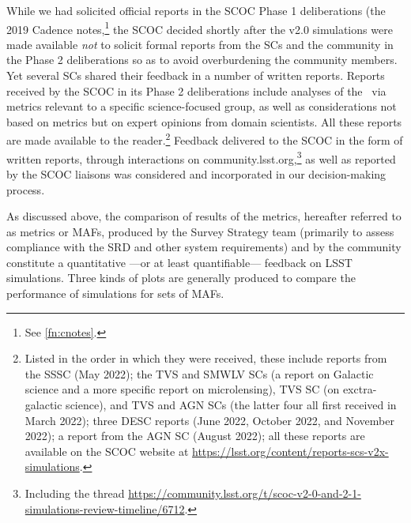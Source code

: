 While we had solicited official reports in the SCOC Phase 1 deliberations (the 2019 Cadence notes,\footnote{See \autoref{fn:cnotes}.}
the SCOC decided shortly after the v2.0 simulations were made available {\it not} to solicit formal reports from the SCs and the community in the Phase 2 deliberations so as to avoid overburdening the community members. Yet several SCs shared their feedback in a number of written reports. Reports received by the SCOC in its Phase 2 deliberations include analyses of the \opsim\ via metrics relevant to a specific science-focused group, as well as  considerations not based on metrics but on expert opinions from domain scientists. All these reports are made available to the reader.\footnote{Listed in the order in which they were received, these include reports from the
SSSC (May 2022);
the TVS and SMWLV SCs (a report on Galactic science and a more specific report on microlensing), TVS SC (on exctra-galactic science), and TVS and AGN SCs (the latter four all first received in March 2022); three 
DESC reports (June 2022, October 2022, and November 2022); a report from the AGN SC (August 2022); all these reports are available on the SCOC website at \url{https://lsst.org/content/reports-scs-v2x-simulations}.} Feedback delivered to the SCOC in the form of written reports, through interactions on community.lsst.org,\footnote{Including the thread \url{https://community.lsst.org/t/scoc-v2-0-and-2-1-simulations-review-timeline/6712}.} as well as reported by the SCOC liaisons was considered and incorporated in our decision-making process. 


As discussed above, the comparison of results of the metrics, hereafter referred to as metrics or MAFs, produced by the Survey Strategy team (primarily to assess compliance with the SRD and other system requirements) and by the community constitute a quantitative ---or at least quantifiable--- feedback on LSST simulations. Three kinds of plots are generally produced to compare the performance of simulations for sets of MAFs.

